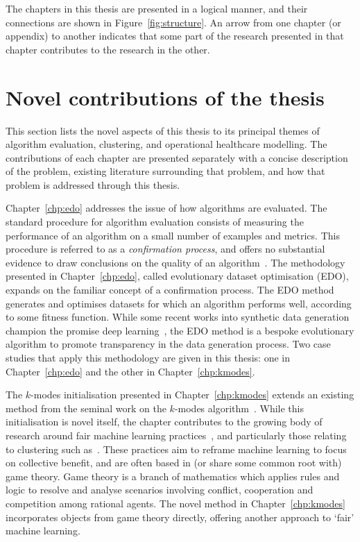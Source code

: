 The chapters in this thesis are presented in a logical manner, and their
connections are shown in Figure~\ref{fig:structure}. An arrow from one chapter
(or appendix) to another indicates that some part of the research presented in
that chapter contributes to the research in the other. 


\section{Novel contributions of the thesis}\label{sec:novel}

This section lists the novel aspects of this thesis to its principal themes of
algorithm evaluation, clustering, and operational healthcare modelling. The
contributions of each chapter are presented separately with a concise
description of the problem, existing literature surrounding that problem, and
how that problem is addressed through this thesis.

Chapter~\ref{chp:edo} addresses the issue of how algorithms are evaluated. The
standard procedure for algorithm evaluation consists of measuring the
performance of an algorithm on a small number of examples and metrics. This
procedure is referred to as a \emph{confirmation process}, and offers no
substantial evidence to draw conclusions on the quality of an
algorithm~\cite{Parker2020}. The methodology presented in Chapter~\ref{chp:edo},
called evolutionary dataset optimisation (EDO), expands on the familiar concept
of a confirmation process. The EDO method generates and optimises datasets for
which an algorithm performs well, according to some fitness function. While some
recent works into synthetic data generation champion the promise deep
learning~\cite{Avino2018,Park2018,Torfi2020}, the EDO method is a bespoke
evolutionary algorithm to promote transparency in the data generation process.
Two case studies that apply this methodology are given in this thesis: one in
Chapter~\ref{chp:edo} and the other in Chapter~\ref{chp:kmodes}.

The \(k\)-modes initialisation presented in Chapter~\ref{chp:kmodes} extends an
existing method from the seminal work on the \(k\)-modes
algorithm~\cite{Huang1998}. While this initialisation is novel itself, the
chapter contributes to the growing body of research around fair machine learning
practices~\cite{Barocas2019,CorbettDavies2018}, and particularly those relating
to clustering such as~\cite{Ahmadian2020,Chen2019}. These practices aim to
reframe machine learning to focus on collective benefit, and are often based in
(or share some common root with) game theory. Game theory is a branch of
mathematics which applies rules and logic to resolve and analyse scenarios
involving conflict, cooperation and competition among rational agents. The novel
method in Chapter~\ref{chp:kmodes} incorporates objects from game theory
directly, offering another approach to `fair' machine learning.

